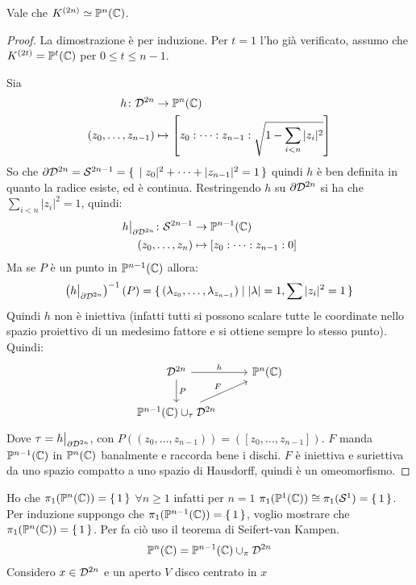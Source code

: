 \begin{proposition}
  Vale che $ K^{(2n)} \simeq \Pjc{n} $.
\end{proposition}
\begin{proof}
  La dimostrazione è per induzione. Per $ t = 1 $ l'ho già verificato, assumo
  che $ K^{(2t)} = \Pjc{t} $ per $ 0 \leq t \leq n-1 $.

  Sia
  \begin{align*}
    h \colon \Disk{2n} & \to \Pjc{n} \\
    (z_0, \dots, z_{n-1}) & \mapsto \left[z_0:\dots: z_{n-1}:\sqrt{1 - \sum_{i < n}|z_i|^2} \right]
  \end{align*}
  So che $ \partial \Disk{2n} = \Sph{2n-1} = \set{|z_0|^2 + \dots + |z_{n-1}|^2 = 1} $
  quindi $ h $ è ben definita in quanto la radice esiste, ed è continua.
  Restringendo $ h $ su $ \partial \Disk{2n} $ si ha che $ \sum_{i < n}|z_i|^2 = 1 $,
  quindi:
  \begin{align*}
    h \big \lvert_{\partial \Disk{2n}} \colon \Sph{2n-1} & \to \Pjc{n-1} \\
    (z_0, \dots, z_{n}) & \mapsto [z_0: \dots: z_{n-1}: 0]
  \end{align*}
  Ma se $ P $ è un punto in $ \Pjc{n-1} $ allora:
  \[
    \left( h \big \lvert_{\partial \Disk{2n}}\right)^{-1}(P) = \set{ (\lambda_{z_0}, \dots, \lambda_{z_{n-1}}) | |\lambda| = 1, \sum|z_i|^2 = 1} %
  \]
  Quindi $ h $ non è iniettiva (infatti tutti si possono scalare tutte le
  coordinate nello spazio proiettivo di un medesimo fattore e si ottiene sempre
  lo stesso punto). Quindi:
  \[
    \begin{tikzcd}
      \Disk{2n} \rar{h} \dar{P} & \Pjc{n} \\
      \Pjc{n-1} \cup_\tau \Disk{2n} \arrow{ur}{F} & {}
    \end{tikzcd}
  \]
  Dove $ \tau = h \big \lvert_{\partial \Disk{2n}} $, con $ P((z_0, \dots, z_{n-1})) = ([z_0, \dots, z_{n-1}]) $.
  $ F $ manda $ \Pjc{n-1} $ in $ \Pjc{n} $ banalmente e raccorda bene i dischi.
  $ F $ è iniettiva e suriettiva da uno spazio compatto a uno spazio di Hausdorff,
  quindi è un omeomorfismo.
\end{proof}
\eproof
Ho che $ \pi_1(\Pjc{n}) = \set{1} $ $ \forall n \geq 1 $
infatti per $ n = 1 $ $ \pi_1(\Pjc{1}) \cong \pi_1(\Sph[1]) = \set{1} $.
Per induzione suppongo che $ \pi_1(\Pjc{n-1}) = \set{1} $, voglio
mostrare che $ \pi_1(\Pjc{n}) = \set{1} $. Per fa ciò
uso il teorema di Seifert-van Kampen.
\[
  \Pjc{n} = \Pjc{n-1} \cup_\pi \Disk{2n}
\]
Considero $ x \in \Disk{2n} $ e un aperto $ V $ disco centrato in $ x $
